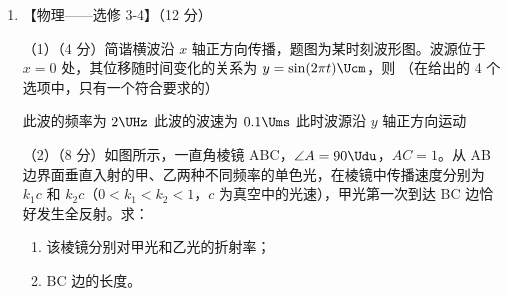 \documentclass[\gkver]{gaokaozhenti}
\begin{document}
\begin{enumerate}
{	（2）①设密封时定高气球内气体的体积为 $V$，由玻意耳定律 $p_{1}V_{1}=kp_{1}(V_{1}+V)$，解得 $V=\frac{1-k}{k}V_{1}$。

	②由查理定律 $\frac{kp_{1}}{T_{1}}=\frac{p}{T_{2}}$，解得 $p=\frac{kp_{1}T_{2}}{T_{1}}$。
}

\item
【物理——选修 3-4】（12 分）

（1）（4 分）简谐横波沿 $x$ 轴正方向传播，题图为某时刻波形图。波源位于 $x=0$ 处，其位移随时间变化的关系为 $y=\sin(2\pi t)\Ucm$，则 （在给出的 4 个选项中，只有一个符合要求的）


{此波的频率为 $2\UHz$}
{此波的波速为 $0.1\Ums$}
{此时波源沿 $y$ 轴正方向运动}

（2）（8 分）如图所示，一直角棱镜 ABC，$\angle A=90\Udu$，$AC=1$。从 AB 边界面垂直入射的甲、乙两种不同频率的单色光，在棱镜中传播速度分别为 $k_{1}c$ 和 $k_{2}c$（$0<k_{1}<k_{2}<1$，$c$ 为真空中的光速），甲光第一次到达 BC 边恰好发生全反射。求：
\begin{enumerate}
	\item
	该棱镜分别对甲光和乙光的折射率；
	\item
	BC 边的长度。
\end{enumerate}
\onepicture[h=3.5cm, align=right]{}


\end{enumerate}
\end{document}
